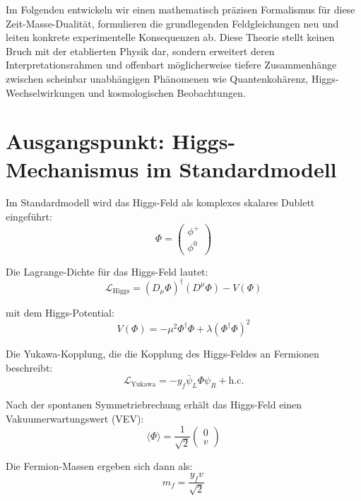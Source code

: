 \documentclass[a4paper,12pt]{article}
\begin{document}
	Im Folgenden entwickeln wir einen mathematisch präzisen Formalismus für diese Zeit-Masse-Dualität, formulieren die grundlegenden Feldgleichungen neu und leiten konkrete experimentelle Konsequenzen ab. Diese Theorie stellt keinen Bruch mit der etablierten Physik dar, sondern erweitert deren Interpretationsrahmen und offenbart möglicherweise tiefere Zusammenhänge zwischen scheinbar unabhängigen Phänomenen wie Quantenkohärenz, Higgs-Wechselwirkungen und kosmologischen Beobachtungen.
	
	\section{Ausgangspunkt: Higgs-Mechanismus im Standardmodell}
	
	Im Standardmodell wird das Higgs-Feld als komplexes skalares Dublett eingeführt:
	\begin{equation}
		\Phi = \begin{pmatrix} \phi^+ \\ \phi^0 \end{pmatrix}
	\end{equation}
	
	Die Lagrange-Dichte für das Higgs-Feld lautet:
	\begin{equation}
		\mathcal{L}_{\text{Higgs}} = (D_\mu \Phi)^\dagger (D^\mu \Phi) - V(\Phi)
	\end{equation}
	
	mit dem Higgs-Potential:
	\begin{equation}
		V(\Phi) = -\mu^2 \Phi^\dagger \Phi + \lambda (\Phi^\dagger \Phi)^2
	\end{equation}
	
	Die Yukawa-Kopplung, die die Kopplung des Higgs-Feldes an Fermionen beschreibt:
	\begin{equation}
		\mathcal{L}_{\text{Yukawa}} = -y_f \bar{\psi}_L \Phi \psi_R + \text{h.c.}
	\end{equation}
	
	Nach der spontanen Symmetriebrechung erhält das Higgs-Feld einen Vakuumerwartungswert (VEV):
	\begin{equation}
		\langle \Phi \rangle = \frac{1}{\sqrt{2}} \begin{pmatrix} 0 \\ v \end{pmatrix}
	\end{equation}
	
	Die Fermion-Massen ergeben sich dann als:
	\begin{equation}
		m_f = \frac{y_f v}{\sqrt{2}}
	\end{equation}
	
\end{document}
